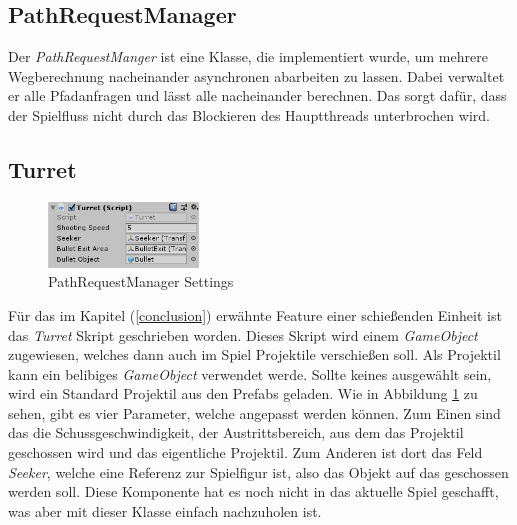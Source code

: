 \subsection*{PathRequestManager}
Der \textit{PathRequestManger} ist eine Klasse, die implementiert wurde, um mehrere Wegberechnung nacheinander asynchronen abarbeiten zu lassen. Dabei verwaltet er alle Pfadanfragen und lässt alle nacheinander berechnen. Das sorgt dafür, dass der Spielfluss nicht durch das Blockieren des Hauptthreads unterbrochen wird.
\subsection*{Turret}
\begin{figure}
    \vspace{-\intextsep}
    \hspace*{-.75\columnsep}
    \includegraphics[width=4cm]{assets/aStarTurretSettings}
    \caption{PathRequestManager Settings}
    \label{fig:aStarTurretSettings}
\end{figure}
Für das im Kapitel  (\ref{conclusion}) erwähnte Feature einer schießenden Einheit ist das \textit{Turret} Skript geschrieben worden. Dieses Skript wird einem \textit{GameObject} zugewiesen, welches dann auch im Spiel Projektile verschie\ss en soll. Als Projektil kann ein belibiges \textit{GameObject} verwendet werde. Sollte keines ausgewählt sein, wird ein Standard Projektil aus den Prefabs geladen. Wie in Abbildung \ref{fig:aStarTurretSettings} zu sehen, gibt es vier Parameter, welche angepasst werden können. Zum Einen sind das die Schussgeschwindigkeit, der Austrittsbereich, aus dem das Projektil geschossen wird und das eigentliche Projektil. Zum Anderen ist dort das Feld \textit{Seeker}, welche eine Referenz zur Spielfigur ist, also das Objekt auf das geschossen werden soll. Diese Komponente hat es noch nicht in das aktuelle Spiel geschafft, was aber mit dieser Klasse einfach nachzuholen ist.
